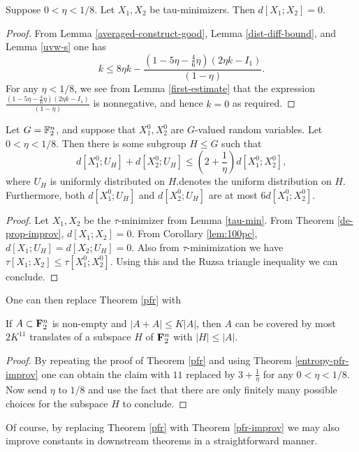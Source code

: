 \begin{theorem}\label{de-prop-improv}\leanok
Suppose $0 < \eta < 1/8$.  Let $X_1, X_2$ be tau-minimizers.  Then $d[X_1;X_2] = 0$.
\end{theorem}

\begin{proof}  From Lemma \ref{averaged-construct-good}, Lemma \ref{dist-diff-bound}, and Lemma \ref{uvw-s} one has
  \[ k \leq 8\eta k - \frac{(1 -5 \eta - \frac{4}{6} \eta)(2 \eta k - I_1)}{(1-\eta)}.\]
  For any $\eta < 1/8$, we see from Lemma \ref{first-estimate} that the expression $\frac{(1 -5 \eta - \frac{4}{6} \eta)(2 \eta k - I_1)}{(1-\eta)}$ is nonnegative, and hence $k = 0$ as required.
\end{proof}

\begin{theorem}\label{entropy-pfr-improv}\leanok
  Let $G = \mathbb{F}_2^n$, and suppose that $X^0_1, X^0_2$ are $G$-valued random variables. Let $0 < \eta < 1/8$.
  Then there is some subgroup $H \leq G$ such that
  \[
    d[X^0_1;U_H] + d[X^0_2;U_H] \le (2+\frac{1}{\eta}) d[X^0_1;X^0_2],
  \]
  where $U_H$ is uniformly distributed on $H$.denotes the uniform distribution on $H$.
  Furthermore, both $d[X^0_1;U_H]$ and $d[X^0_2;U_H]$ are at most $6 d[X^0_1;X^0_2]$.
\end{theorem}

\begin{proof}    Let $X_1, X_2$ be the $\tau$-minimizer from Lemma \ref{tau-min}.  From Theorem \ref{de-prop-improv}, $d[X_1;X_2]=0$.  From Corollary \ref{lem:100pc}, $d[X_1;U_H] = d[X_2; U_H] = 0$.  Also from $\tau$-minimization we have $\tau[X_1;X_2] \leq \tau[X^0_1;X^0_2]$.  Using this and the Ruzsa triangle inequality we can conclude.
\end{proof}

One can then replace Theorem \ref{pfr} with

\begin{theorem}\label{pfr-improv}\leanok
  If $A \subset {\bf F}_2^n$ is non-empty and $|A+A| \leq K|A|$, then $A$ can be covered by most $2K^{11}$ translates of a subspace $H$ of ${\bf F}_2^n$ with $|H| \leq |A|$.
\end{theorem}

\begin{proof} By repeating the proof of Theorem \ref{pfr} and using Theorem \ref{entropy-pfr-improv} one can obtain the claim with $11$ replaced by $3 +\frac{1}{\eta}$ for any $0 < \eta < 1/8$.  Now send $\eta$ to $1/8$ and use the fact that there are only finitely many possible choices for the subspace $H$ to conclude.
\end{proof}

Of course, by replacing Theorem \ref{pfr} with Theorem \ref{pfr-improv} we may also improve constants in downstream theorems in a straightforward manner.
